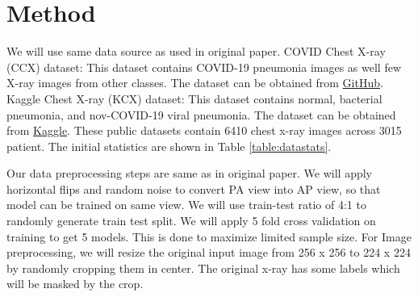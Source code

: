 \documentclass{sigkddExp}
\begin{document}
%

\section{Method}

We will use same data source as used in original paper. COVID Chest X-ray
(CCX) dataset: This dataset contains COVID-19 pneumonia images as well few X-ray
images from other classes. The dataset can be obtained from
\href{https://github.com/ieee8023/covid-chestxray-dataset}{GitHub}.
Kaggle Chest X-ray (KCX) dataset: This dataset contains normal, bacterial
pneumonia, and nov-COVID-19 viral pneumonia. The dataset can be
obtained from \href{https://www.kaggle.com/paultimothymooney/chest-xray-pneumonia}{Kaggle}.
These public datasets contain 6410 chest x-ray images across 3015 patient. The initial
statistics are shown in Table \ref{table:datastats}.

Our data preprocessing steps are same as in original paper. We will apply
horizontal flips and random noise to convert PA view into AP view, so that model
can be trained on same view. We will use train-test ratio of 4:1 to randomly
generate train test split. We will apply 5 fold cross validation on training to
get 5 models. This is done to maximize limited sample size. For Image
preprocessing, we will resize the original input image from 256 x 256 to 224 x
224 by randomly cropping them in center. The original x-ray has some labels
which will be masked by the crop.
\end{document}
